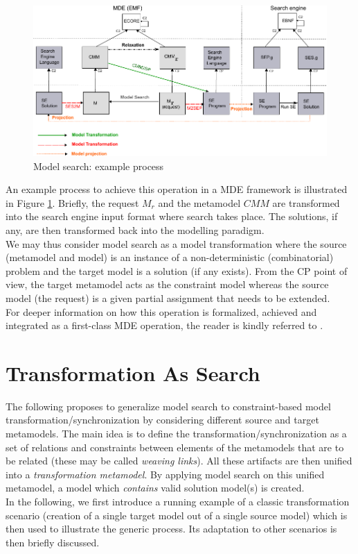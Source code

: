\documentclass{llncs}
\begin{document}
\begin{figure}[htb] \centering \includegraphics[scale=0.8]{img/SearchMethodology-emf-SearchEngine-smaller-simpler-lighter.pdf}
\caption{Model search: example process}
\label{fig:ModelSearch}
\end{figure}
%
An example process to achieve this operation in a MDE framework is illustrated in Figure \ref{fig:ModelSearch}. Briefly, the request $M_r$ and the metamodel $CMM$ are transformed into the search engine input format where search takes place. The solutions, if any, are then transformed back into the modelling paradigm.\\
We may thus consider model search as a model transformation where the source (metamodel and model) is
an instance of a non-deterministic (combinatorial) problem and the target model
is a solution (if any exists). From the CP point of view, the target metamodel
acts as the constraint model whereas the source model (the request) is a given
partial assignment that needs to be extended.\\
For deeper information on how this operation is formalized, achieved and integrated as a
first-class MDE operation, the reader is kindly referred to \cite{modelsearch09}.
%
\section{Transformation As Search}
\label{sec:TAS}
%
The following proposes to generalize model search to constraint-based model
transformation/synchronization by considering different source and target metamodels. The main
idea is to define the transformation/synchronization as a set of relations and constraints
between elements of the metamodels that are to be related (these may be called \emph{weaving
links}). All these artifacts are then unified into a \emph{transformation metamodel}. By applying model search on this unified metamodel, a model which \emph{contains} valid solution model(s) is created.\\
In the following, we first introduce a running example of a classic transformation scenario (creation of a single target model out of a single source model) which is then used to illustrate the generic process. Its adaptation to other scenarios is then briefly discussed.
%
\end{document}

